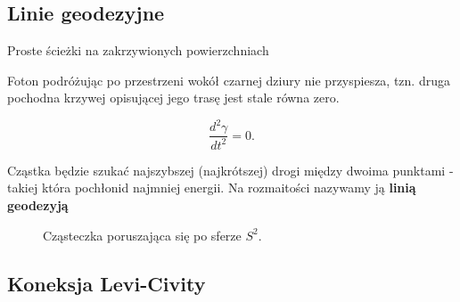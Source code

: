 \documentclass[polish, 9pt, xcolor=table, hyperref={pdfpagemode=FullScreen}]{beamer}
\begin{document}
\subsection{Linie geodezyjne}

\begin{frame}{Proste ścieżki na zakrzywionych powierzchniach}

Foton podróżując po przestrzeni wokół czarnej dziury nie przyspiesza, tzn. druga pochodna krzywej opisującej jego trasę jest stale równa zero.

$$\frac{d^2 \gamma} {d t^2}=0.$$ 

Cząstka będzie szukać najszybszej (najkrótszej) drogi między dwoima punktami - takiej która pochłonid najmniej energii. Na rozmaitości nazywamy ją \textbf{linią geodezyją}

\renewcommand{\figurename}{Rysunek}
\begin{figure}
  \centering 
  \vspace{1cm}
  \caption{Cząsteczka poruszająca się po sferze $S^2$.}\label{czasteczka po sferze}
  \vspace{1cm}
\end{figure}

\end{frame}

\subsection{Koneksja Levi-Civity}
\end{document}
